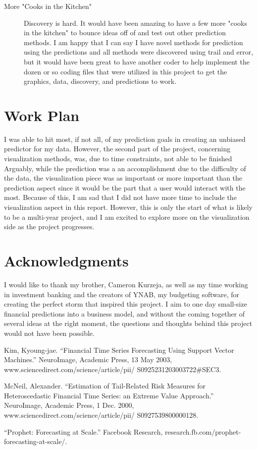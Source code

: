 \documentclass[11pt,a4paper]{article}
\begin{document}
\begin{description}
	\item[More "Cooks in the Kitchen"] Discovery is hard. It would have been amazing to have a few more "cooks in the kitchen" to bounce ideas off of and test out other prediction methods. I am happy that I can say I have novel methods for prediction using the \yinyang predictions and all methods were discovered using trail and error, but it would have been great to have another coder to help implement the dozen or so coding files that were utilized in this project to get the graphics, data, discovery, and predictions to work. 
\end{description}

\section{Work Plan}

I was able to hit most, if not all, of my prediction goals in creating an unbiased predictor for my data. However, the second part of the project, concerning visualization methods, was, due to time constraints, not able to be finished Arguably, while the prediction was a an accomplishment due to the difficulty of the data, the visualization piece was as important or more important than the prediction aspect since it would be the part that a user would interact with the most. Because of this, I am sad that I did not have more time to include the visualization aspect in this report. However, this is only the start of what is likely to be a multi-year project, and I am excited to explore more on the visualization side as the project progresses. 

\section*{Acknowledgments}

I would like to thank my brother, Cameron Kurzeja, as well as my time working in investment banking and the creators of YNAB, my budgeting software, for creating the perfect storm that inspired this project. I aim to one day small-size financial predictions into a business model, and without the coming together of several ideas at the right moment, the questions and thoughts behind this project would not have been possible. 

\begin{thebibliography}{9}

	
	Kim, Kyoung-jae. “Financial Time Series Forecasting Using Support Vector Machines.” NeuroImage, Academic Press, 13 May 2003, www.sciencedirect.com/science/article/pii/
	S0925231203003722\#SEC3.
	
	McNeil, Alexander. “Estimation of Tail-Related Risk Measures for Heteroscedastic Financial Time Series: an Extreme Value Approach.” NeuroImage, Academic Press, 1 Dec. 2000, www.sciencedirect.com/science/article/pii/
	S0927539800000128.
	
	“Prophet: Forecasting at Scale.” Facebook Research, research.fb.com/prophet-forecasting-at-scale/.
\end{thebibliography}
\end{document}
